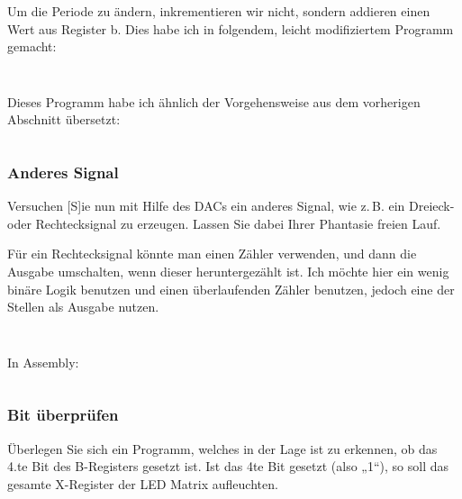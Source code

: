 Um die Periode zu ändern, inkrementieren wir nicht, sondern addieren einen Wert
aus Register b. Dies habe ich in folgendem, leicht modifiziertem Programm
gemacht:

\inputminted[fontsize=\small, linenos]{cpp}{../Prototypen/d.cpp}

\begin{multicols}{9}
	\inputminted[fontsize=\footnotesize]{text}{d.txt}
\end{multicols}

Dieses Programm habe ich ähnlich der Vorgehensweise aus dem vorherigen
Abschnitt übersetzt:

\inputminted[fontsize=\small, linenos]{text}{../Assembly/d.s}

\subsubsection{Anderes Signal}

\begin{problem}
	Versuchen [S]ie nun mit Hilfe des DACs ein anderes Signal, wie z.\,B. ein
	Dreieck- oder Rechtecksignal zu erzeugen. Lassen Sie dabei Ihrer Phantasie
	freien Lauf.
\end{problem}

Für ein Rechtecksignal könnte man einen Zähler verwenden, und dann die Ausgabe
umschalten, wenn dieser heruntergezählt ist. Ich möchte hier ein wenig binäre
Logik benutzen und einen überlaufenden Zähler benutzen, jedoch eine der Stellen
als Ausgabe nutzen.

\inputminted[fontsize=\small, linenos]{cpp}{../Prototypen/e.cpp}

\begin{multicols}{9}
	\inputminted[fontsize=\footnotesize]{text}{e.txt}
\end{multicols}

In Assembly:

\inputminted[fontsize=\small, linenos]{text}{../Assembly/e.s}

\subsubsection{Bit überprüfen}

\begin{problem}
	Überlegen Sie sich ein Programm, welches in der Lage ist zu erkennen, ob
	das 4.te Bit des B-Registers gesetzt ist. Ist das 4te Bit gesetzt (also
	„1“), so soll das gesamte X-Register der LED Matrix aufleuchten.
\end{problem}

